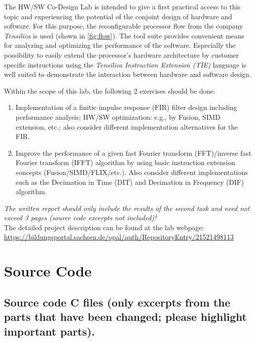 \documentclass{tudscrreprt}
\begin{document}
The HW/SW Co-Design Lab is intended to give a first practical access to this
topic and experiencing the potential of the conjoint design of hardware and
software. For this purpose, the reconfigurable processor flow from the company
\emph{Tensilica} is used (shown in \cref{fig:flow}). The tool suite provides
convenient means for analyzing and optimizing the performance of the software.
Especially the possibility to easily extend the processor's hardware
architecture by customer specific instructions using the \emph{Tensilica
Instruction Extension (TIE)} language is well suited to demonstrate the
interaction between hardware and software design.

Within the scope of this lab, the following 2 exercises should be done:

\begin{enumerate}
\item Implementation of a finitie impulse response (FIR) filter design including
    performance analysis; HW/SW optimization: e.g., by Fusion, SIMD extension,
    etc.; also consider different implementation alternatives for the FIR.
\item Improve the performance of a given fast Fourier transform (FFT)/inverse
    fast Fourier transform (IFFT) algorithm by using basic instruction extension
    concepts (Fusion/SIMD/FLIX/etc.). Also consider different implementations
    such as the Decimation in Time (DIT) and Decimation in Frequency (DIF)
    algorithm.
\end{enumerate}

\noindent\emph{The written report should only include the results of the second task and
need not exceed 3 pages (source code excerpts not included)!}\\

\noindent The detailed project description can be found at the lab webpage:\\
\url{https://bildungsportal.sachsen.de/opal/auth/RepositoryEntry/21521498113}

\chapter*{Source Code}

\section*{Source code C files (only excerpts from the parts that have been
changed; please highlight important parts).}
\end{document}
